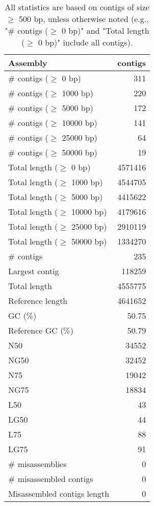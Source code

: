 \documentclass[12pt,a4paper]{article}
\begin{document}
\begin{table}[ht]
\begin{center}
\caption{All statistics are based on contigs of size $\geq$ 500 bp, unless otherwise noted (e.g., "\# contigs ($\geq$ 0 bp)" and "Total length ($\geq$ 0 bp)" include all contigs).}
\begin{tabular}{|l*{1}{|r}|}
\hline
Assembly & contigs \\ \hline
\# contigs ($\geq$ 0 bp) & 311 \\ \hline
\# contigs ($\geq$ 1000 bp) & 220 \\ \hline
\# contigs ($\geq$ 5000 bp) & 172 \\ \hline
\# contigs ($\geq$ 10000 bp) & 141 \\ \hline
\# contigs ($\geq$ 25000 bp) & 64 \\ \hline
\# contigs ($\geq$ 50000 bp) & 19 \\ \hline
Total length ($\geq$ 0 bp) & 4571416 \\ \hline
Total length ($\geq$ 1000 bp) & 4544705 \\ \hline
Total length ($\geq$ 5000 bp) & 4415622 \\ \hline
Total length ($\geq$ 10000 bp) & 4179616 \\ \hline
Total length ($\geq$ 25000 bp) & 2910119 \\ \hline
Total length ($\geq$ 50000 bp) & 1334270 \\ \hline
\# contigs & 235 \\ \hline
Largest contig & 118259 \\ \hline
Total length & 4555775 \\ \hline
Reference length & 4641652 \\ \hline
GC (\%) & 50.75 \\ \hline
Reference GC (\%) & 50.79 \\ \hline
N50 & 34552 \\ \hline
NG50 & 32452 \\ \hline
N75 & 19042 \\ \hline
NG75 & 18834 \\ \hline
L50 & 43 \\ \hline
LG50 & 44 \\ \hline
L75 & 88 \\ \hline
LG75 & 91 \\ \hline
\# misassemblies & 0 \\ \hline
\# misassembled contigs & 0 \\ \hline
Misassembled contigs length & 0 \\ \hline

\end{tabular}
\end{center}
\end{table}
\end{document}
